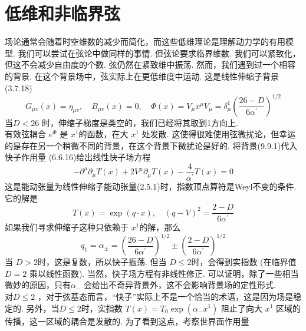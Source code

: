 \section{低维和非临界弦}%
场论通常会随着时空维数的减少而简化，而这些低维理论是理解动力学的有用模型. 我们可以尝试在弦论中做同样的事情. 但弦论要求临界维数. 我们可以紧致化，但这不会减少自由度的个数. 弦仍然在紧致维中振荡. 然而，我们遇到过一个相容的背景. 在这个背景场中，弦实际上在更低维度中运动. 这是线性伸缩子背景(3.7.18)
\begin{subequations}
\begin{equation}
		G_{\mu v}(x) =\eta_{\mu v}, \quad B_{\mu v}(x)=0, \quad \Phi(x)=V_{\mu} x^{\mu} 
\end{equation}
\begin{equation}		
		V_{\mu} =\delta_{\mu}^{1}\left(\frac{26-D}{6 \alpha^{\prime}}\right)^{1 / 2}
\end{equation}
\end{subequations}
当$D<26$ 时，伸缩子梯度是类空的，我们已经将其取到1方向上.\\
有效弦耦合 $e^{\Phi}$ 是 $x^{1}$的函数，在大 $x^{1}$ 处发散. 这使得很难使用弦微扰论，但幸运的是存在另一个稍微不同的背景，在这个背景下微扰论是好的. 将背景(9.9.1)代入快子作用量 (6.6.16)给出线性快子场方程
\begin{equation}
	-\partial^{\mu} \partial_{\mu} T(x)+2 V^{\mu} \partial_{\mu} T(x)-\frac{4}{\alpha^{\prime}} T(x)=0
\end{equation}
这是能动张量为线性伸缩子能动张量(2.5.1)时，指数顶点算符是Weyl不变的条件. 它的解是
\begin{equation}
	T(x)=\exp (q \cdot x), \quad(q-V)^{2}=\frac{2-D}{6 \alpha^{\prime}}
\end{equation}
如果我们寻求伸缩子这种只依赖于 $x^{1}$的解，那么
\begin{equation}
	q_{1}=\alpha_{\pm}=\left(\frac{26-D}{6 \alpha^{\prime}}\right)^{1 / 2} \pm\left(\frac{2-D}{6 \alpha^{\prime}}\right)^{1 / 2}
\end{equation}
当 $D>2$时，这是复数，所以快子振荡. 但当 $D \leq 2$时，会得到实指数 (在临界值 $D=2$ 乘以线性函数). 当然，快子场方程有非线性修正. 可以证明，除了一些相当微妙的原因，只有$\alpha_{-}$ 会给出不奇异背景外，这不会影响背景场的定性形式.\\
对$D \leq 2$ ，对于弦基态而言，“快子”实际上不是一个恰当的术语，这是因为场是稳定的. 另外，当$D \leq 2$时，实指数 $T(x)=T_{0} \exp \left(\alpha_{-} x^{1}\right)$ 阻止了向大 $x^{1}$ 区域的传播，这一区域的耦合是发散的. 为了看到这点，考察世界面作用量
